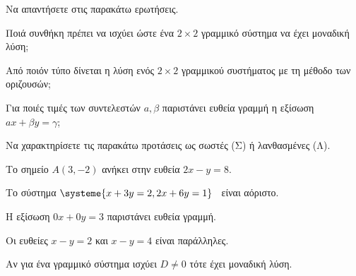 \vspace{-7mm}
\begin{erwthma}
\item Να απαντήσετε στις παρακάτω ερωτήσεις.
\begin{rlist}[leftmargin=3mm]
\item Ποιά συνθήκη πρέπει να ισχύει ώστε ένα $ 2\times2 $ γραμμικό σύστημα να έχει μοναδική λύση;
\item Από ποιόν τύπο δίνεται η λύση ενός $ 2\times2 $ γραμμικού συστήματος με τη μέθοδο των οριζουσών;
\item Για ποιές τιμές των συντελεστών $ a,\beta $ παριστάνει ευθεία γραμμή η εξίσωση $ ax+\beta y=\gamma $;
\end{rlist}
\item Να χαρακτηρίσετε τις παρακάτω προτάσεις ως σωστές (Σ) ή λανθασμένες (Λ).
\begin{rlist}[leftmargin=3mm]
\item Το σημείο $ A(3,-2) $ ανήκει στην ευθεία $ 2x-y=8 $.
\item Το σύστημα $ \systeme{x+3y=2,2x+6y=1} $ \ είναι αόριστο.
\item Η εξίσωση $ 0x+0y=3 $ παριστάνει ευθεία γραμμή.
\item Οι ευθείες $ x-y=2 $ και $ x-y=4 $ είναι παράλληλες.
\item Αν για ένα γραμμικό σύστημα ισχύει $ D\neq0 $ τότε έχει μοναδική λύση.
\end{rlist}
\end{erwthma}